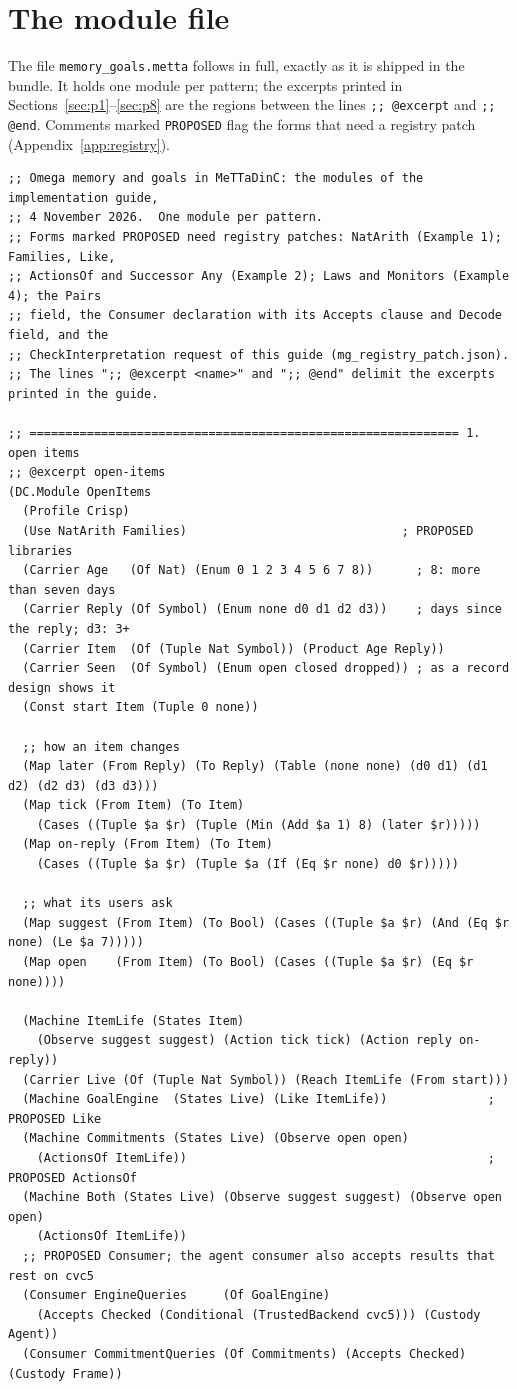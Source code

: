 \documentclass[11pt]{article}
\newcommand{\fpath}[1]{\nolinkurl{#1}}
\newcommand{\code}[1]{\texttt{#1}}
\theoremstyle{definition}
\theoremstyle{plain}
\begin{document}
\section{The module file}\label{app:sources}

The file \fpath{memory_goals.metta} follows in full, exactly as it is shipped in the bundle. It
holds one module per pattern; the excerpts printed in Sections~\ref{sec:p1}--\ref{sec:p8} are the
regions between the lines \code{;; @excerpt} and \code{;; @end}. Comments marked
\code{PROPOSED} flag the forms that need a registry patch (Appendix~\ref{app:registry}).
\begin{lstlisting}[style=mettafull]
;; Omega memory and goals in MeTTaDinC: the modules of the implementation guide,
;; 4 November 2026.  One module per pattern.
;; Forms marked PROPOSED need registry patches: NatArith (Example 1); Families, Like,
;; ActionsOf and Successor Any (Example 2); Laws and Monitors (Example 4); the Pairs
;; field, the Consumer declaration with its Accepts clause and Decode field, and the
;; CheckInterpretation request of this guide (mg_registry_patch.json).
;; The lines ";; @excerpt <name>" and ";; @end" delimit the excerpts printed in the guide.

;; ============================================================ 1. open items
;; @excerpt open-items
(DC.Module OpenItems
  (Profile Crisp)
  (Use NatArith Families)                              ; PROPOSED libraries
  (Carrier Age   (Of Nat) (Enum 0 1 2 3 4 5 6 7 8))      ; 8: more than seven days
  (Carrier Reply (Of Symbol) (Enum none d0 d1 d2 d3))    ; days since the reply; d3: 3+
  (Carrier Item  (Of (Tuple Nat Symbol)) (Product Age Reply))
  (Carrier Seen  (Of Symbol) (Enum open closed dropped)) ; as a record design shows it
  (Const start Item (Tuple 0 none))

  ;; how an item changes
  (Map later (From Reply) (To Reply) (Table (none none) (d0 d1) (d1 d2) (d2 d3) (d3 d3)))
  (Map tick (From Item) (To Item)
    (Cases ((Tuple $a $r) (Tuple (Min (Add $a 1) 8) (later $r)))))
  (Map on-reply (From Item) (To Item)
    (Cases ((Tuple $a $r) (Tuple $a (If (Eq $r none) d0 $r)))))

  ;; what its users ask
  (Map suggest (From Item) (To Bool) (Cases ((Tuple $a $r) (And (Eq $r none) (Le $a 7)))))
  (Map open    (From Item) (To Bool) (Cases ((Tuple $a $r) (Eq $r none))))

  (Machine ItemLife (States Item)
    (Observe suggest suggest) (Action tick tick) (Action reply on-reply))
  (Carrier Live (Of (Tuple Nat Symbol)) (Reach ItemLife (From start)))
  (Machine GoalEngine  (States Live) (Like ItemLife))              ; PROPOSED Like
  (Machine Commitments (States Live) (Observe open open)
    (ActionsOf ItemLife))                                          ; PROPOSED ActionsOf
  (Machine Both (States Live) (Observe suggest suggest) (Observe open open)
    (ActionsOf ItemLife))
  ;; PROPOSED Consumer; the agent consumer also accepts results that rest on cvc5
  (Consumer EngineQueries     (Of GoalEngine)
    (Accepts Checked (Conditional (TrustedBackend cvc5))) (Custody Agent))
  (Consumer CommitmentQueries (Of Commitments) (Accepts Checked) (Custody Frame))


\end{lstlisting}
\end{document}
